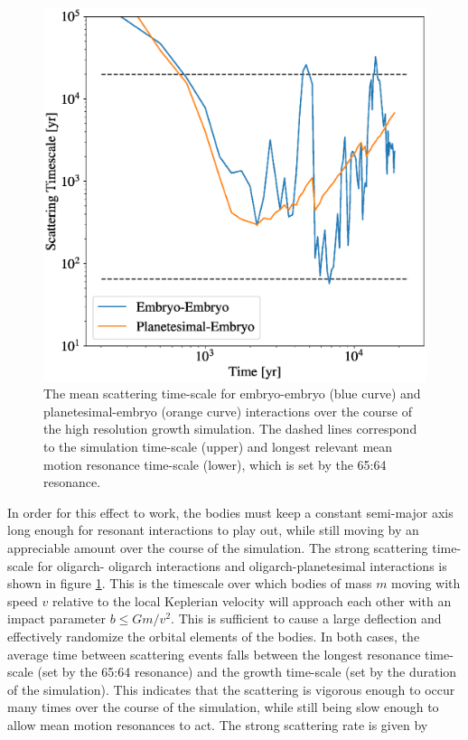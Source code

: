 \begin{figure}
    \includegraphics[width=\columnwidth]{figures/plSS/scatter_timescale.eps}
    \caption{The mean scattering time-scale for embryo-embryo (blue curve) and planetesimal-embryo (orange curve) interactions 
    over the course of the high resolution growth simulation. The dashed lines correspond to the simulation time-scale (upper) and 
    longest relevant mean motion resonance time-scale (lower), which is set by the 65:64 resonance.}
    \label{fig:scatter_timescale}
\end{figure}

In order for this effect to work, the bodies must keep a constant semi-major axis long enough for resonant interactions to play 
out, while still moving by an appreciable amount over the course of the simulation. The strong scattering time-scale for oligarch-
oligarch interactions and oligarch-planetesimal interactions is shown in figure \ref{fig:scatter_timescale}. This is the timescale 
over which bodies of mass $m$ moving with speed $v$ relative to the local Keplerian velocity will approach each other with an 
impact parameter $b \leq G m / v^{2}$. This is sufficient to cause a large deflection and effectively randomize the orbital 
elements of the bodies. In both cases, the average time between scattering events falls between the longest resonance time-
scale (set by the 65:64 resonance) and the growth time-scale (set by the duration of the simulation). This indicates that the 
scattering is vigorous enough to occur many times over the course of the simulation, while still being slow enough to allow mean 
motion resonances to act. The strong scattering rate is given by

